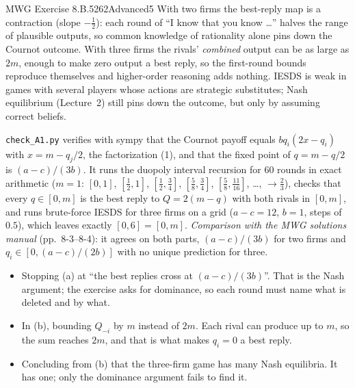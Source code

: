 \begin{exsol}{MWG Exercise 8.B.5}{262}{Advanced}{5}
\interp With two firms the best-reply map is a contraction (slope $-\tfrac12$): each round of ``I
know that you know \dots'' halves the range of plausible outputs, so common knowledge of
rationality alone pins down the Cournot outcome. With three firms the rivals' \emph{combined}
output can be as large as $2m$, enough to make zero output a best reply, so the first-round bounds
reproduce themselves and higher-order reasoning adds nothing. IESDS is weak in games with several
players whose actions are strategic substitutes; Nash equilibrium (Lecture~2) still pins down the
outcome, but only by assuming correct beliefs.

\verify \texttt{check\_A1.py} verifies with sympy that the Cournot payoff equals
$b q_i(2x - q_i)$ with $x = m - q_j/2$, the factorization (1), and that the fixed point of
$q = m - q/2$ is $(a-c)/(3b)$. It runs the duopoly interval recursion for 60 rounds in exact
arithmetic ($m = 1$: $[0,1]$, $[\tfrac12, 1]$, $[\tfrac12, \tfrac34]$, $[\tfrac58,\tfrac34]$,
$[\tfrac58,\tfrac{11}{16}]$, \dots, $\to \tfrac23$), checks that every $q \in [0, m]$ is the best
reply to $Q = 2(m - q)$ with both rivals in $[0, m]$, and runs brute-force IESDS for three firms on
a grid ($a - c = 12$, $b = 1$, steps of $0.5$), which leaves exactly $[0, 6] = [0, m]$.
\emph{Comparison with the MWG solutions manual} (pp.~8-3--8-4): it agrees on both parts,
$(a-c)/(3b)$ for two firms and $q_i \in [0, (a-c)/(2b)]$ with no unique prediction for three.

\mistakes
\begin{itemize}
  \item Stopping (a) at ``the best replies cross at $(a-c)/(3b)$''. That is the Nash argument; the
  exercise asks for dominance, so each round must name what is deleted and by what.
  \item In (b), bounding $Q_{-i}$ by $m$ instead of $2m$. Each rival can produce up to $m$, so the
  sum reaches $2m$, and that is what makes $q_i = 0$ a best reply.
  \item Concluding from (b) that the three-firm game has many Nash equilibria. It has one; only
  the dominance argument fails to find it.
\end{itemize}

\end{exsol}

